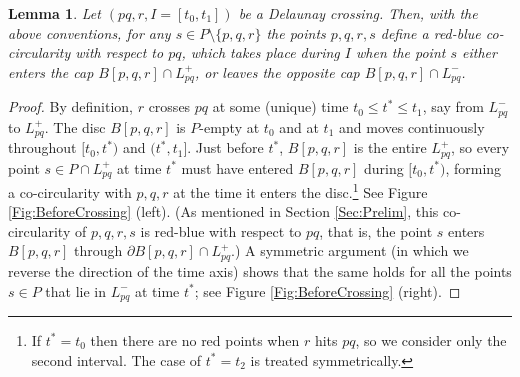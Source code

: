 \documentclass[letter,11pt]{article}
\newtheorem{lemma}[theorem]{Lemma}
\def \L{{L}}
\begin{document}
\begin{lemma}\label{Lemma:OnceCollin}
Let $(pq,r,I=[t_0,t_1])$ be a Delaunay crossing. Then, with the above conventions, for any $s\in P\setminus\{p,q,r\}$ the points $p,q,r,s$ define a red-blue co-circularity with respect to $pq$, which takes place during $I$ when the point $s$ either enters the cap $B[p,q,r]\cap \L_{pq}^+$, or leaves the opposite cap $B[p,q,r]\cap \L_{pq}^-$.
\end{lemma}
\begin{proof}
By definition, $r$ crosses $pq$ at some (unique) time $t_0\leq t^*\leq t_1$, say from $\L_{pq}^-$ to $\L_{pq}^+$. The disc $B[p,q,r]$ is $P$-empty at $t_0$ and at $t_1$ and moves continuously throughout $[t_0,t^*)$ and $(t^*,t_1]$.
Just before $t^*$, $B[p,q,r]$ is the entire $\L_{pq}^+$, so every point $s\in P\cap \L_{pq}^+$ at time $t^*$ must have entered $B[p,q,r]$ during $[t_0,t^*)$, forming a co-circularity with $p,q,r$ at the time it enters the disc.\footnote{If $t^*=t_0$ then
there are no red points when $r$ hits $pq$, so we consider only the second interval. The case of $t^*=t_2$ is treated symmetrically.} See Figure \ref{Fig:BeforeCrossing} (left). (As mentioned in Section \ref{Sec:Prelim}, this co-circularity of $p,q,r,s$ is red-blue with respect to $pq$, that is, the point $s$ enters $B[p,q,r]$ through $\partial B[p,q,r]\cap \L_{pq}^+$.) A symmetric argument (in which we reverse the direction of the time axis) shows that the same holds for all the points $s\in P$ that lie in $\L_{pq}^-$ at time $t^*$; see Figure \ref{Fig:BeforeCrossing} (right). 
\end{proof}
\end{document}
